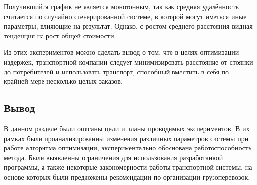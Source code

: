 Получившийся график не является монотонным, так как средняя удалённость считается по случайно сгенерированной системе, в которой могут иметься иные параметры, влияющие на результат. Однако, с ростом среднего расстояния видная тенденция на рост общей стоимости. 

Из этих экспериментов можно сделать вывод о том, что в целях оптимизации издержек, транспортной компании следует минимизировать расстояние от стоянки до потребителей и использовать транспорт, способный вместить в себя по крайней мере несколько целых заказов.

\subsection*{Вывод}
В данном разделе были описаны цели и планы проводимых экспериментов. В их рамках были проанализированны изменения различных параметров системы при работе алгоритма оптимизации, экспериментально обоснована работоспособность метода. Были выявленны ограничения для использования разработанной программы, а также некоторые закономерности работы транспортной системы, на основе которых были предложены рекомендации по организации грузоперевозок. 

\pagebreak